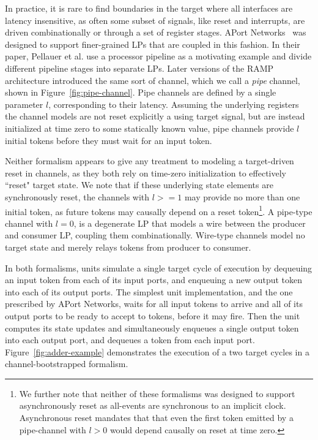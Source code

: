In practice, it is rare to find boundaries in the target where all
interfaces are latency insensitive, as often some subset of signals, like reset
and interrupts, are driven combinationally or through a set of register stages.
APort Networks~\cite{APortNetworks} was designed to support
finer-grained LPs that are coupled in this fashion. In their
paper, Pellauer et al. use a processor pipeline as a motivating example and
divide different pipeline stages into separate LPs. Later versions of the RAMP
architecture introduced the same sort of channel, which we call a \emph{pipe}
channel, shown in Figure~\ref{fig:pipe-channel}.  Pipe channels are defined by
a single parameter $l$, corresponding to their latency. Assuming the underlying
registers the channel models are not reset explicitly a using target signal, but are
instead initialized at time zero to some statically known value, pipe channels
provide $l$ initial tokens before they must wait for an input token.

Neither formalism appears to give any treatment to modeling a target-driven reset in
channels, as they both rely on time-zero initialization to effectively
``reset" target state.  We note that if these underlying state elements are
synchronously reset, the channels with $l >= 1$ may provide no more than one
initial token, as future tokens may causally depend on a reset
token\footnote{We further note that neither of these formalisms was designed
to support asynchronously reset as all-events are synchronous to an implicit
clock. Asynchronous reset mandates that that even
the first token emitted by a pipe-channel with $l > 0$ would depend causally
on reset at time zero.}. A pipe-type channel with $l = 0$, is a degenerate LP
that models a wire between the producer and consumer LP, coupling them
combinationally. Wire-type channels model no target state and merely relays tokens from producer to consumer.

In both formalisms, units simulate a single target cycle of execution by dequeuing an input token
from each of its input ports, and enqueuing a new output token into each of
its output ports. The simplest unit implementation, and the one prescribed by
APort Networks, waits for all input tokens to arrive and all of its output
ports to be ready to accept to tokens, before it may fire. Then the
unit computes its state updates and simultaneously enqueues a single output
token into each output port, and dequeues a token from each input port.
Figure~\ref{fig:adder-example} demonstrates the execution of a two target cycles in a channel-bootstrapped formalism.

